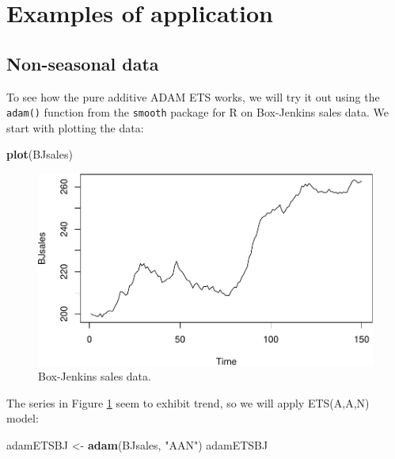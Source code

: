 \documentclass[]{book}
\newenvironment{Shaded}{\begin{snugshade}}{\end{snugshade}}
\newcommand{\KeywordTok}[1]{\textcolor[rgb]{0.13,0.29,0.53}{\textbf{#1}}}
\newcommand{\NormalTok}[1]{#1}
\newcommand{\StringTok}[1]{\textcolor[rgb]{0.31,0.60,0.02}{#1}}
\theoremstyle{definition}
\theoremstyle{definition}
\theoremstyle{definition}
\theoremstyle{definition}
\theoremstyle{remark}
\begin{document}
\hypertarget{ADAMETSPureAdditiveExamples}{%
\section{Examples of application}\label{ADAMETSPureAdditiveExamples}}

\hypertarget{non-seasonal-data}{%
\subsection{Non-seasonal data}\label{non-seasonal-data}}

To see how the pure additive ADAM ETS works, we will try it out using the \texttt{adam()} function from the \texttt{smooth} package for R on Box-Jenkins sales data. We start with plotting the data:

\begin{Shaded}
\begin{Highlighting}[]
\KeywordTok{plot}\NormalTok{(BJsales)}
\end{Highlighting}
\end{Shaded}

\begin{figure}
\centering
\includegraphics{Svetunkov--2022----ADAM_files/figure-latex/BJsalesDataPlot-1.pdf}
\caption{\label{fig:BJsalesDataPlot}Box-Jenkins sales data.}
\end{figure}

The series in Figure \ref{fig:BJsalesDataPlot} seem to exhibit trend, so we will apply ETS(A,A,N) model:

\begin{Shaded}
\begin{Highlighting}[]
\NormalTok{adamETSBJ <-}\StringTok{ }\KeywordTok{adam}\NormalTok{(BJsales, }\StringTok{"AAN"}\NormalTok{)}
\NormalTok{adamETSBJ}
\end{Highlighting}
\end{Shaded}
\end{document}
